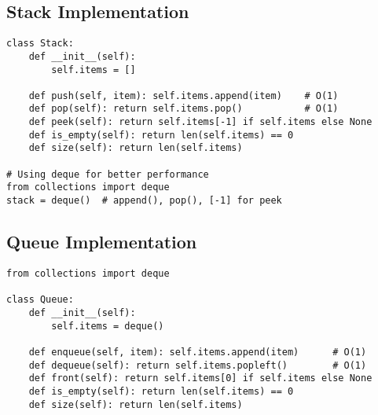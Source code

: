\subsection{Stack Implementation}
\begin{verbatim}
class Stack:
    def __init__(self):
        self.items = []
    
    def push(self, item): self.items.append(item)    # O(1)
    def pop(self): return self.items.pop()           # O(1)
    def peek(self): return self.items[-1] if self.items else None
    def is_empty(self): return len(self.items) == 0
    def size(self): return len(self.items)

# Using deque for better performance
from collections import deque
stack = deque()  # append(), pop(), [-1] for peek
\end{verbatim}

\subsection{Queue Implementation}
\begin{verbatim}
from collections import deque

class Queue:
    def __init__(self):
        self.items = deque()
    
    def enqueue(self, item): self.items.append(item)      # O(1)
    def dequeue(self): return self.items.popleft()        # O(1)
    def front(self): return self.items[0] if self.items else None
    def is_empty(self): return len(self.items) == 0
    def size(self): return len(self.items)
\end{verbatim}

